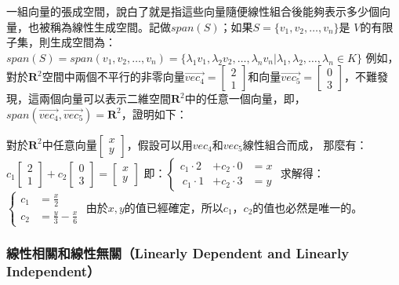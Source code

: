 \documentclass[11pt]{article}
\begin{document}
{一組向量的張成空間，說白了就是指這些向量隨便線性組合後能夠表示多少個向量，也被稱為線性生成空間。記做\(span(S)\)；如果\(S = \{v_1, v_2, \dots, v_n\}\)是
\(V\)的有限子集，則生成空間為：\(span(S) = span(v_1, v_2, \dots, v_n) = \{\lambda_1 v_1, \lambda_2 v_2, \dots, \lambda_n v_n|\lambda_1, \lambda_2, \dots, \lambda_n \in K\}\)
例如，對於\(\mathbf{R}^2\)空間中兩個不平行的非零向量\(\vec{vec_4} = \begin{bmatrix} 2 \\ 1 \end{bmatrix}\)和向量\(\vec{vec_5} = \begin{bmatrix} 0 \\ 3 \end{bmatrix}\)，不難發現，這兩個向量可以表示二維空間\(\mathbf{R}^2\)中的任意一個向量，即，\(span(\vec{vec_4}, \vec{vec_5}) = \mathbf{R}^2\)，證明如下：

    對於\(\mathbf{R}^2\)中任意向量\(\begin{bmatrix} x \\ y \end{bmatrix}\)，假設可以用\(vec_4\)和\(vec_5\)線性組合而成，
那麼有：\(c_1 \begin{bmatrix}2 \\ 1\end{bmatrix} + c_2 \begin{bmatrix} 0 \\ 3 \end{bmatrix} = \begin{bmatrix} x \\ y \end{bmatrix}\)
即：\(\left\{ \begin{align} c_1 \cdot 2 & + c_2 \cdot 0 &= x\\\
c_1 \cdot 1 & + c_2 \cdot 3 &= y \end{align} \right.\) 求解得：
\(\left\{ \begin{align} c_1 &= \frac{x}{2}\\ c_2 &= \frac{y}{3} - \frac{x}{6} \end{align} \right.\)
由於\(x, y\)的值已經確定，所以\(c_1，c_2\)的值也必然是唯一的。

    \hypertarget{ux7ddaux6027ux76f8ux95dcux548cux7ddaux6027ux7121ux95dclinearly-dependent-and-linearly-independent}{%
\subsubsection{線性相關和線性無關（Linearly Dependent and Linearly
Independent）}\label{ux7ddaux6027ux76f8ux95dcux548cux7ddaux6027ux7121ux95dclinearly-dependent-and-linearly-independent}}

}
\end{document}
